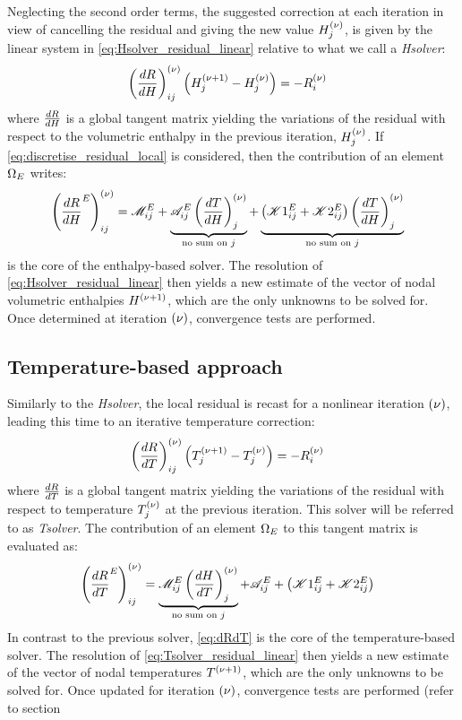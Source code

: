 Neglecting the second order terms, the suggested correction at each iteration in view of cancelling 
the residual and giving the new value $H_j^{{\left( \nu \right)}}$, is given by the linear system in \cref{eq:Hsolver_residual_linear}
relative to what we call a \emph{Hsolver}:
\begin{align}
\label{eq:Hsolver_residual_linear}
& \left( \frac{dR}{dH} \right)^{{\left( \nu \right)}}_{ij} \left( H_j^{{\left( \nu+1 \right)}} - H_j^{{\left( \nu \right)}} \right) = -R_i^{{\left( \nu \right)}}
\end{align}
where $\frac{dR}{dH}$ is a global tangent matrix yielding the variations of the residual with respect to the volumetric enthalpy 
in the previous iteration, $H_j^{{\left( \nu \right)}}$. If \cref{eq:discretise_residual_local} is considered, then the contribution of an element $\Omega_E$ writes:
\begin{align}
\label{eq:dRdH}
& \left( \frac{dR}{dH}^E \right)^{{\left( \nu \right)}}_{ij} 
= \mathscr{M}_{ij}^E 
+ \underbrace{\mathscr{A}_{ij}^E \left( \frac{dT}{dH} \right)^{{\left( \nu \right)}}_{j}}_{\text{no sum on }j}
+ \underbrace{\left( \mathscr{K}1_{ij}^E + \mathscr{K}2_{ij}^E \right) \left( \frac{dT}{dH} \right)^{{\left( \nu \right)}}_{j}}_{\text{no sum on }j}
\end{align}
 is the core of the enthalpy-based solver. The resolution of \cref{eq:Hsolver_residual_linear} 
then yields a new estimate of the vector of nodal volumetric enthalpies $H^{{\left( \nu+1 \right)}}$, which are the only unknowns to be solved for. 
Once determined at iteration ${\left( \nu \right)}$, convergence tests are performed.


\subsection{Temperature-based approach }

Similarly to the \emph{Hsolver}, the local residual is recast for a nonlinear iteration ${\left( \nu \right)}$, 
leading this time to an iterative temperature correction:
\begin{align}
\label{eq:Tsolver_residual_linear}
& \left( \frac{dR}{dT} \right)^{{\left( \nu \right)}}_{ij} \left( T_j^{{\left( \nu+1 \right)}} - T_j^{{\left( \nu \right)}} \right) = -R_i^{{\left( \nu \right)}}
\end{align}
where $\frac{dR}{dT}$ is a global tangent matrix yielding the variations of the residual with respect to temperature $T_j^{{\left( \nu \right)}}$ at the previous iteration. 
This solver will be referred to as \emph{Tsolver}.
The contribution of an element $\Omega_E$ to this tangent matrix is evaluated as:
\begin{align}
\label{eq:dRdT}
& \left( \frac{dR}{dT}^E \right)^{{\left( \nu \right)}}_{ij}
= \underbrace{\mathscr{M}_{ij}^E \left( \frac{dH}{dT} \right)^{{\left( \nu \right)}}_{j}}_{\text{no sum on }j}
+ \mathscr{A}_{ij}^E
+ \left( \mathscr{K}1_{ij}^E + \mathscr{K}2_{ij}^E \right)
\end{align}
In contrast to the previous solver, \cref{eq:dRdT} is the core of the temperature-based solver. The resolution of \cref{eq:Tsolver_residual_linear} 
then yields a new estimate of the vector of nodal temperatures $T^{{\left( \nu+1 \right)}}$, which are the only unknowns to be solved for. 
Once updated for iteration ${\left( \nu \right)}$, convergence tests are performed (refer to section %
%
%
